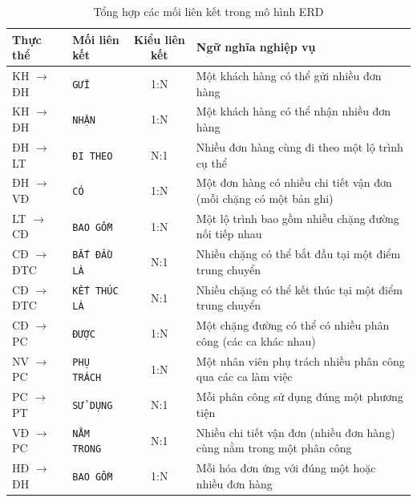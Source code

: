 \documentclass[11pt]{report}
\begin{document}
\begin{table}[H]
    \centering
    \renewcommand{\tabularxcolumn}[1]{m{#1}}
    \begin{tabularx}{\textwidth}{|l|l|c|X|} \hline
        \rowcolor{teal!30}
        \textbf{Thực thể} & \textbf{Mối liên kết} & \textbf{Kiểu liên kết} & \textbf{Ngữ nghĩa nghiệp vụ} \\ \hline
        \small{KH $\to$ ĐH}    & \texttt{GỬI}         & 1:N & Một khách hàng có thể gửi nhiều đơn hàng \\ \hline
        \small{KH $\to$ ĐH}    & \texttt{NHẬN}        & 1:N & Một khách hàng có thể nhận nhiều đơn hàng \\ \hline
        \small{ĐH $\to$ LT}    & \texttt{ĐI THEO}     & N:1 & Nhiều đơn hàng cùng đi theo một lộ trình cụ thể \\ \hline
        \small{ĐH $\to$ VĐ}    & \texttt{CÓ}          & 1:N & Một đơn hàng có nhiều chi tiết vận đơn (mỗi chặng có một bản ghi) \\ \hline
        \small{LT $\to$ CĐ}    & \texttt{BAO GỒM}     & 1:N & Một lộ trình bao gồm nhiều chặng đường nối tiếp nhau \\ \hline
        \small{CĐ $\to$ ĐTC}   & \texttt{BẮT ĐẦU LÀ}  & N:1 & Nhiều chặng có thể bắt đầu tại một điểm trung chuyển \\ \hline
        \small{CĐ $\to$ ĐTC}   & \texttt{KẾT THÚC LÀ} & N:1 & Nhiều chặng có thể kết thúc tại một điểm trung chuyển \\ \hline
        \small{CĐ $\to$ PC}    & \texttt{ĐƯỢC}        & 1:N & Một chặng đường có thể có nhiều phân công (các ca khác nhau) \\ \hline
        \small{NV $\to$ PC}    & \texttt{PHỤ TRÁCH}   & 1:N & Một nhân viên phụ trách nhiều phân công qua các ca làm việc \\ \hline
        \small{PC $\to$ PT}    & \texttt{SỬ DỤNG}     & N:1 & Mỗi phân công sử dụng đúng một phương tiện \\ \hline
        \small{VĐ $\to$ PC}    & \texttt{NẰM TRONG}   & N:1 & Nhiều chi tiết vận đơn (nhiều đơn hàng) cùng nằm trong một phân công \\ \hline
        \small{HĐ $\to$ ĐH}    & \texttt{BAO GỒM}     & 1:N & Mỗi hóa đơn ứng với đúng một hoặc nhiều đơn hàng \\ \hline
    \end{tabularx}
    \caption{Tổng hợp các mối liên kết trong mô hình ERD}
    \label{tab:relationships}
\end{table}
\end{document}
